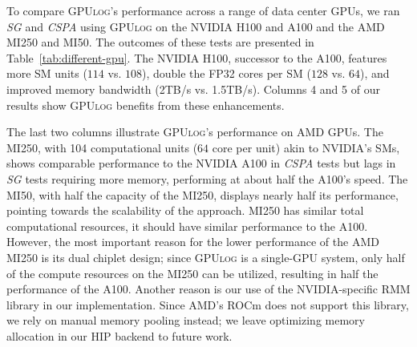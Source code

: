 \documentclass[nonacm,sigplan]{acmart}
\newcommand{\tool}{\textsc{GPUlog}}
\begin{document}
To compare \tool{}'s performance across a range of data center GPUs, we ran \textit{SG} and \textit{CSPA} using \tool{} on the NVIDIA H100 and A100 and the AMD MI250 and MI50. The outcomes of these tests are presented in Table~\ref{tab:different-gpu}. The NVIDIA H100, successor to the A100, features more SM units ($114$ vs. $108$), double the FP32 cores per SM ($128$ vs. $64$), and improved memory bandwidth (2TB/s vs. 1.5TB/s). Columns 4 and 5 of our results show \tool{} benefits from these enhancements. %

The last two columns illustrate \tool{}'s performance on AMD GPUs. The MI250, with 104 computational units ($64$ core per unit) akin to NVIDIA’s SMs, shows comparable performance to the NVIDIA A100 in \textit{CSPA} tests but lags in \textit{SG} tests requiring more memory, performing at about half the A100's speed. The MI50, with half the capacity of the MI250, displays nearly half its performance, pointing towards the scalability of the approach. MI250 has similar total computational resources, it should have similar performance to the A100. However, the most important reason for the lower performance of the AMD MI250 is its dual chiplet design; since \tool{} is a single-GPU system, only half of the compute resources on the MI250 can be utilized, resulting in half the performance of the A100. Another reason is our use of the NVIDIA-specific RMM library in our implementation. Since AMD's ROCm does not support this library, we rely on manual memory pooling instead; we leave optimizing memory allocation in our HIP backend to future work.
\end{document}
